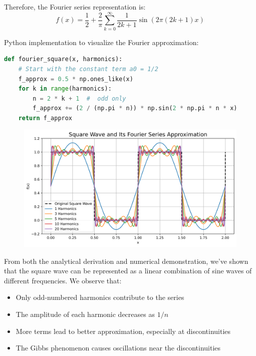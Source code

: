 \documentclass[12pt, a4paper, oneside]{ctexart}
\begin{document}
Therefore, the Fourier series representation is:
\[f(x) = \frac{1}{2} + \frac{2}{\pi}\sum_{k=0}^{\infty} \frac{1}{2k+1}\sin(2\pi(2k+1)x)\]



Python implementation to visualize the Fourier approximation:

\begin{lstlisting}[style=mystyle,language=Python]
	def fourier_square(x, harmonics):
    # Start with the constant term a0 = 1/2
    f_approx = 0.5 * np.ones_like(x)
    for k in range(harmonics):
        n = 2 * k + 1  #  odd only
        f_approx += (2 / (np.pi * n)) * np.sin(2 * np.pi * n * x)
    return f_approx
\end{lstlisting}


\begin{figure}[htbp]
	\centering
	\includegraphics[width=1\textwidth]{result/square_wave_fourier.png}
\end{figure}





From both the analytical derivation and numerical demonstration, we've shown that the square wave can be represented as a linear combination of sine waves of different frequencies. We observe that:
\begin{itemize}[itemsep=-3pt, parsep=0pt]
	\item Only odd-numbered harmonics contribute to the series
	\item The amplitude of each harmonic decreases as $1/n$
	\item More terms lead to better approximation, especially at discontinuities
	\item The Gibbs phenomenon causes oscillations near the discontinuities
\end{itemize}
\end{document}
